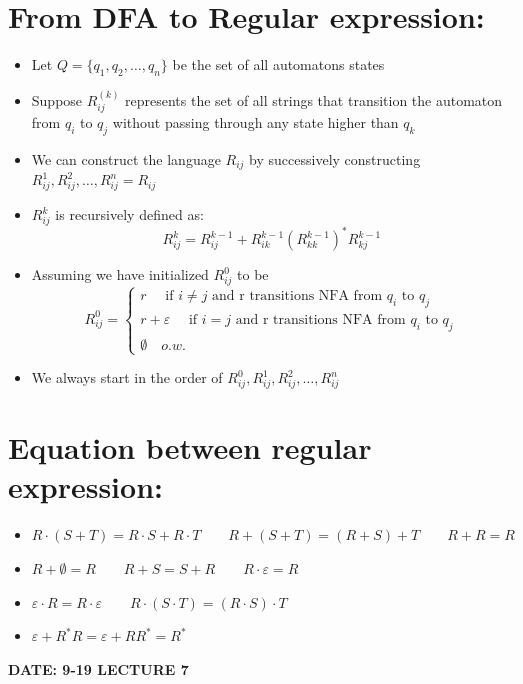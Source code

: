 \documentclass [9 pt]{article}
\theoremstyle{definition}
\begin{document}
\section*{From DFA to Regular expression:}
\begin{itemize}
	\item Let $Q = \{q_1,q_2, \ldots,q_n\}$ be the set of all automatons states
	\item Suppose $R^{(k)}_{ij}$ represents the set of all strings that transition the automaton from $q_i$ to $q_j$ without passing through any state higher than $q_k$
	\item We can construct the language $R_{ij}$ by successively constructing $R^{1}_{ij},R^2_{ij}, \ldots ,R^{n}_{ij} =R_{ij}$
	\item $R^{k}_{ij}$ is recursively defined as:
	 $$ R^k_{ij} = R^{k-1}_{ij} + R^{k-1}_{ik}(R^{k - 1}_{kk})^{*}R^{k-1}_{kj}$$
	 \item Assuming we have initialized $R^0_{ij}$ to be
	 $$R^0_{ij} =  \begin{cases}
	 	r \quad \text{ if } i \neq j \text{ and r transitions NFA from $q_i$ to $q_j$} \\
	 	r + \varepsilon\quad  \text{ if } i = j \text{ and r transitions NFA from $q_i$ to $q_j$}
	 	\\
	 	\emptyset \quad o.w.
	 \end{cases}$$
	 \item We always start in the order of $R^{0}_{ij}, R^{1}_{ij},R^2_{ij}, \ldots ,R^{n}_{ij}$
\end{itemize}



\section*{Equation between regular expression:}
\begin{itemize}
	\item $R\cdot (S+T) = R\cdot S + R\cdot T \quad \quad R + (S + T) = (R + S) + T \quad \quad  R + R = R$
	\item $R + \emptyset = R \quad \quad R + S = S + R \quad \quad R \cdot \varepsilon = R$
	\item $\varepsilon \cdot R = R \cdot \varepsilon \quad \quad R\cdot (S \cdot T) = (R\cdot S) \cdot T $
	\item $\varepsilon + R^* R = \varepsilon + R R^* = R^*$
\end{itemize}

\newpage
\textbf{DATE: 9-19 LECTURE 7}
\end{document}
